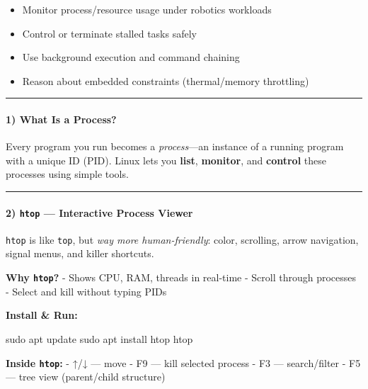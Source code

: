 \documentclass[
  english,
  paper=a4,
  oneside  ,captions=tableheading
]{scrartcl}
\newenvironment{Shaded}{}{}
\newcommand{\ExtensionTok}[1]{#1}
\newcommand{\FunctionTok}[1]{\textcolor[rgb]{0.02,0.16,0.49}{#1}}
\newcommand{\NormalTok}[1]{#1}
\providecommand{\tightlist}{%
  \setlength{\itemsep}{0pt}\setlength{\parskip}{0pt}}
\begin{document}
\begin{itemize}
\tightlist
\item
  Monitor process/resource usage under robotics workloads
\item
  Control or terminate stalled tasks safely
\item
  Use background execution and command chaining
\item
  Reason about embedded constraints (thermal/memory throttling)
\end{itemize}

\begin{center}\rule{0.5\linewidth}{0.5pt}\end{center}

\paragraph{1) What Is a Process?}\label{what-is-a-process}

Every program you run becomes a \emph{process}---an instance of a
running program with a unique ID (PID). Linux lets you \textbf{list},
\textbf{monitor}, and \textbf{control} these processes using simple
tools.

\begin{center}\rule{0.5\linewidth}{0.5pt}\end{center}

\paragraph{\texorpdfstring{2) \texttt{htop} --- Interactive Process
Viewer}{2) htop --- Interactive Process Viewer}}\label{htop-interactive-process-viewer}

\faLightbulb \texttt{htop} is like \texttt{top}, but \emph{way more
human-friendly}: color, scrolling, arrow navigation, signal menus, and
killer shortcuts.

\textbf{Why \texttt{htop}?} - Shows CPU, RAM, threads in real-time -
Scroll through processes - Select and kill without typing PIDs

\textbf{Install \& Run:}

\begin{Shaded}
\begin{Highlighting}[]
\FunctionTok{sudo}\NormalTok{ apt update}
\FunctionTok{sudo}\NormalTok{ apt install htop}
\ExtensionTok{htop}
\end{Highlighting}
\end{Shaded}

\textbf{Inside \texttt{htop}:} - ↑/↓ --- move - F9 --- kill selected
process - F3 --- search/filter - F5 --- tree view (parent/child
structure)
\end{document}
